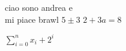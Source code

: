 \documentclass[a4paper,12pt]{article}
\begin{document}
ciao sono andrea e\\
mi piace brawl
${5\pm3}$
$2+3a=8$

$\sum_{i=0}^n {x_i +2^i}$
\end{document}

